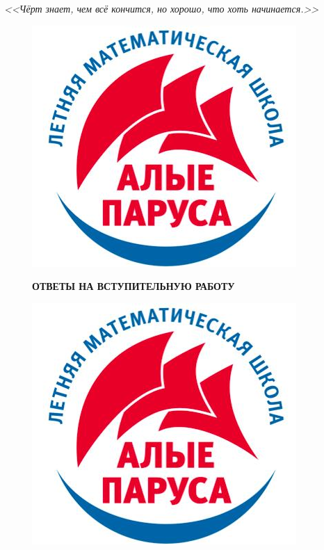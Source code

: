 \documentclass[12 pt, a4paper]{article}%
\begin{document}
	\newpage
	\begin{flushright}
		\textit{<<Чёрт знает, чем всё кончится, но хорошо, что хоть начинается.>>}
	\end{flushright}
	\begin{figure}[t]
		\begin{minipage}[h]{0.33\linewidth}
			\includegraphics[width=0.33\linewidth, left]{logo.jpg}
		\end{minipage}
		\begin{minipage}[h]{0.33\linewidth}
			\centering
			\large{\textbf{ОТВЕТЫ НА ВСТУПИТЕЛЬНУЮ РАБОТУ}}\\
		\end{minipage}
		\begin{minipage}[h]{0.33\linewidth}
			\includegraphics[width=0.33\linewidth, right]{logo.jpg}
		\end{minipage}
		\label{ris:image1}
	\end{figure}
\end{document}
